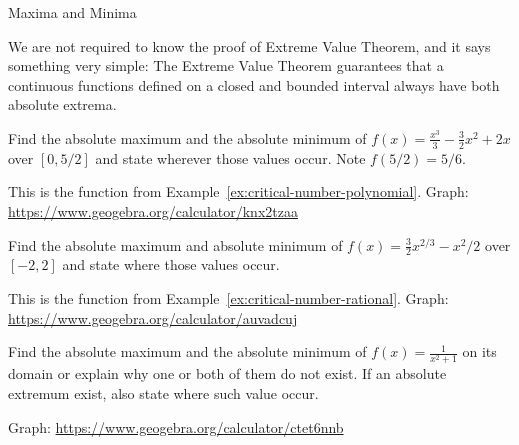 \documentclass[../main.tex]{subfiles}
\begin{document}
\begin{lesson}{Maxima and Minima}
\begin{mdframed}[style=withref-compact]
  \end{mdframed}
  We are not required to know the proof of Extreme Value Theorem, and it says something very simple: The Extreme Value Theorem guarantees that a continuous functions defined on a closed and bounded interval always have both absolute extrema.
  \clearpage

  \begin{example} \label{ex:closed-interval-method-intro}
    Find the absolute maximum and the absolute minimum of \(f(x) = \frac{x^{3}}{3} - \frac{3}{2}x^{2} + 2x\) over \([0,5/2]\) and state wherever those values occur. Note \(f(5/2) = 5/6\).

    This is the function from Example~\ref{ex:critical-number-polynomial}. Graph: \url{https://www.geogebra.org/calculator/knx2tzaa}

  \end{example}

  \begin{example}
    Find the absolute maximum and absolute minimum of \(f(x) = \frac{3}{2} x^{2/3} - x^{2}/2\) over \([-2,2]\) and state where those values occur.

    This is the function from Example~\ref{ex:critical-number-rational}. Graph: \url{https://www.geogebra.org/calculator/auvadcuj}

  \end{example}
  \clearpage

  \begin{example}
    Find the absolute maximum and the absolute minimum of \(f(x) = \frac{1}{x^{2}+1}\) on its domain or explain why one or both of them do not exist. If an absolute extremum exist, also state where such value occur.

    Graph: \url{https://www.geogebra.org/calculator/ctet6nnb}

  \end{example}
\end{lesson}
\end{document}

